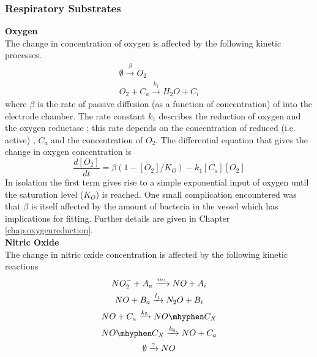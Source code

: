 \subsubsection{Respiratory Substrates}
{\bf Oxygen}\\
The change in concentration of oxygen is affected by the following kinetic processes.
\begin{equation*}
\begin{gathered}
\emptyset\xrightarrow{\beta} O_2\\
O_2 + C_a\xrightarrow{k_1} H_{2}O + C_i
\end{gathered}
\end{equation*}
where $\beta$ is the rate of passive diffusion (as a function of \cOxygen{} concentration) of \cOxygen{} into the electrode chamber. The rate constant $k_1$ describes the reduction of oxygen and the oxygen reductase \cbbthree{}; this rate depends on the concentration of reduced (i.e. active) \cbbthree{}, $C_a$ and the concentration of $O_2$.
The differential equation that gives the change in oxygen concentration is
\begin{equation}
\frac{d[O_2]}{dt} = \beta(1-[O_2]/K_O) - k_{1}[C_a][O_2]
\label{eq:oxygen}
\end{equation}
In isolation the first term gives rise to a simple exponential input of oxygen until the saturation level ($K_O$) is reached. One small complication encountered was that $\beta$ is itself affected by the amount of bacteria in the vessel which has implications for fitting. Further details are given in Chapter \ref{chap:oxygenreduction}.\\
{\bf Nitric Oxide}\\
The change in nitric oxide concentration is affected by the following kinetic reactions
\begin{equation*}
\begin{gathered}
NO_2^- + A_a \xrightarrow{m_1} NO + A_i\\
NO + B_a \xrightarrow{l_1} N_2O + B_i\\
NO + C_a \xrightarrow{k_5} NO\mhyphen C_X\\
NO\mhyphen C_X \xrightarrow{k_6} NO + C_a\\
\emptyset\xrightarrow{\gamma} NO
\end{gathered}
\end{equation*}
